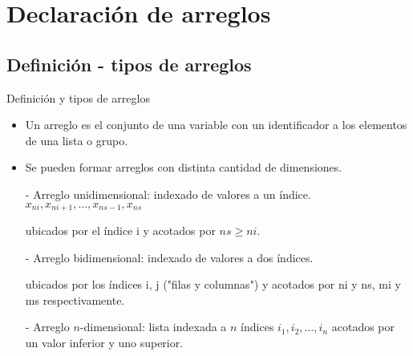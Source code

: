 
\section{Declaración de arreglos}  



\subsection{Definición - tipos de arreglos}

\begin{frame}[fragile]{Definición y tipos de arreglos}
 \begin{itemize}[<+(0)->]
  \item Un arreglo es el conjunto de una variable con un identificador a los elementos de una lista o grupo.
  \item Se pueden formar arreglos con distinta cantidad de dimensiones.
  \item [-] Arreglo unidimensional: indexado de valores a un índice.\\ 
  \centering $x_{ni}, x_{ni+1}, \ldots, x_{ns-1}, x_{ns}$
  \item [ ] ubicados por el índice i y acotados por $ns \geq ni$. 
  \item [-] Arreglo bidimensional: indexado de valores a dos índices. 
  \item [ ] ubicados por los índices i, j ("filas y columnas") y acotados por ni y ns, mi y ms respectivamente.
  \item [-] Arreglo $n$-dimensional: lista indexada a $n$ índices $i_{1}, i_{2}, \ldots, i_{n}$ acotados por un valor inferior y uno superior. 
 \end{itemize}
\end{frame} 


